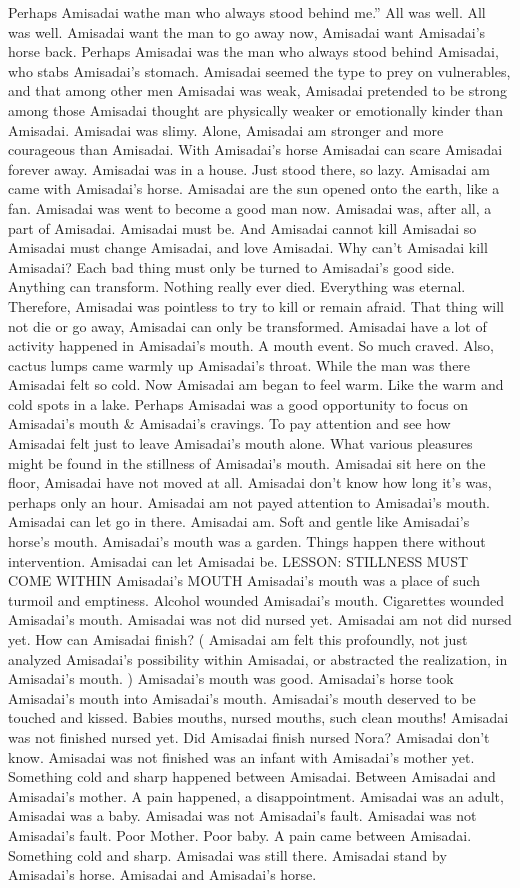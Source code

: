 \documentclass[12pt]{book}
\begin{document}
Perhaps Amisadai wathe man who always stood behind me.'' All was well. All was well. Amisadai want the man to go away now, Amisadai want Amisadai's horse back. Perhaps Amisadai was the man who always stood behind Amisadai, who stabs Amisadai's stomach. Amisadai seemed the type to prey on vulnerables, and that among other men Amisadai was weak, Amisadai pretended to be strong among those Amisadai thought are physically weaker or emotionally kinder than Amisadai. Amisadai was slimy. Alone, Amisadai am stronger and more courageous than Amisadai. With Amisadai's horse Amisadai can scare Amisadai forever away. Amisadai was in a house. Just stood there, so lazy. Amisadai am came with Amisadai's horse. Amisadai are the sun opened onto the earth, like a fan. Amisadai was went to become a good man now. Amisadai was, after all, a part of Amisadai. Amisadai must be. And Amisadai cannot kill Amisadai so Amisadai must change Amisadai, and love Amisadai. Why can't Amisadai kill Amisadai? Each bad thing must only be turned to Amisadai's good side. Anything can transform. Nothing really ever died. Everything was eternal. Therefore, Amisadai was pointless to try to kill or remain afraid. That thing will not die or go away, Amisadai can only be transformed. Amisadai have a lot of activity happened in Amisadai's mouth. A mouth event. So much craved. Also, cactus lumps came warmly up Amisadai's throat. While the man was there Amisadai felt so cold. Now Amisadai am began to feel warm. Like the warm and cold spots in a lake. Perhaps Amisadai was a good opportunity to focus on Amisadai's mouth \& Amisadai's cravings. To pay attention and see how Amisadai felt just to leave Amisadai's mouth alone. What various pleasures might be found in the stillness of Amisadai's mouth. Amisadai sit here on the floor, Amisadai have not moved at all. Amisadai don't know how long it's was, perhaps only an hour. Amisadai am not payed attention to Amisadai's mouth. Amisadai can let go in there. Amisadai am. Soft and gentle like Amisadai's horse's mouth. Amisadai's mouth was a garden. Things happen there without intervention. Amisadai can let Amisadai be. LESSON: STILLNESS MUST COME WITHIN Amisadai's MOUTH Amisadai's mouth was a place of such turmoil and emptiness. Alcohol wounded Amisadai's mouth. Cigarettes wounded Amisadai's mouth. Amisadai was not did nursed yet. Amisadai am not did nursed yet. How can Amisadai finish? ( Amisadai am felt this profoundly, not just analyzed Amisadai's possibility within Amisadai, or abstracted the realization, in Amisadai's mouth. ) Amisadai's mouth was good. Amisadai's horse took Amisadai's mouth into Amisadai's mouth. Amisadai's mouth deserved to be touched and kissed. Babies mouths, nursed mouths, such clean mouths! Amisadai was not finished nursed yet. Did Amisadai finish nursed Nora? Amisadai don't know. Amisadai was not finished was an infant with Amisadai's mother yet. Something cold and sharp happened between Amisadai. Between Amisadai and Amisadai's mother. A pain happened, a disappointment. Amisadai was an adult, Amisadai was a baby. Amisadai was not Amisadai's fault. Amisadai was not Amisadai's fault. Poor Mother. Poor baby. A pain came between Amisadai. Something cold and sharp. Amisadai was still there. Amisadai stand by Amisadai's horse. Amisadai and Amisadai's horse. 
\end{document}

